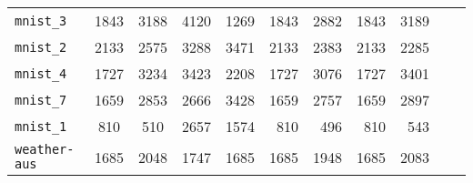 \begin{tabular}{lccrrrrrrrr}
\texttt{mnist\_3} & 1843 & 3188 & 4120 & 1269 & 1843 & 2882 & 1843 & 3189\\
\texttt{mnist\_2} & 2133 & 2575 & 3288 & 3471 & 2133 & 2383 & 2133 & 2285\\
\texttt{mnist\_4} & 1727 & 3234 & 3423 & 2208 & 1727 & 3076 & 1727 & 3401\\
\texttt{mnist\_7} & 1659 & 2853 & 2666 & 3428 & 1659 & 2757 & 1659 & 2897\\
\texttt{mnist\_1} & 810 & 510 & 2657 & 1574 & 810 & 496 & 810 & 543\\
\texttt{weather-aus} & 1685 & 2048 & 1747 & 1685 & 1685 & 1948 & 1685 & 2083\\
\bottomrule
\end{tabular}
